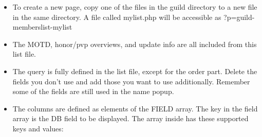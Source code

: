 \documentclass[12pt, a4paper]{article}
\begin{document}
\begin{itemize}
\item To create a new page, copy one of the files in the guild directory to a
  new file in the same directory. A file called mylist.php will be accessible as
  ?p=guild-memberslist-mylist
\item The MOTD, honor/pvp overviews, and update info are all included from this
  list file.
\item The query is fully defined in the list file, except for the order part.
  Delete the fields you don't use and add those you want to use additionally.
  Remember some of the fields are still used in the name popup.
\item The columns are defined as elements of the FIELD array. The key in the
  field array is the DB field to be displayed. The array inside has these
  supported keys and values:


\end{itemize}
\end{document}
